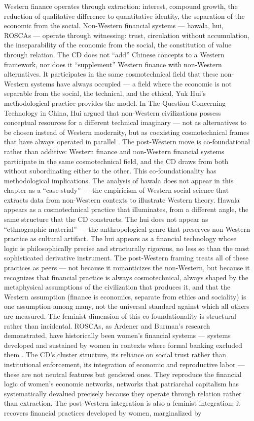 Western finance operates through extraction: interest, compound growth, the reduction of qualitative difference to quantitative identity, the separation of the economic from the social. Non-Western financial systems — hawala, hui, ROSCAs — operate through witnessing: trust, circulation without accumulation, the inseparability of the economic from the social, the constitution of value through relation. The CD does not “add” Chinese concepts to a Western framework, nor does it “supplement” Western finance with non-Western alternatives. It participates in the same cosmotechnical field that these non-Western systems have always occupied — a field where the economic is not separable from the social, the technical, and the ethical. Yuk Hui’s methodological practice provides the model. In The Question Concerning Technology in China, Hui argued that non-Western civilizations possess conceptual resources for a different technical imaginary — not as alternatives to be chosen instead of Western modernity, but as coexisting cosmotechnical frames that have always operated in parallel \cite[pp.~18--45]{hui_2017}. The post-Western move is co-foundational rather than additive: Western finance and non-Western financial systems participate in the same cosmotechnical field, and the CD draws from both without subordinating either to the other. This co-foundationality has methodological implications. The analysis of hawala does not appear in this chapter as a “case study” — the empiricism of Western social science that extracts data from non-Western contexts to illustrate Western theory. Hawala appears as a cosmotechnical practice that illuminates, from a different angle, the same structure that the CD constructs. The hui does not appear as “ethnographic material” — the anthropological genre that preserves non-Western practice as cultural artifact. The hui appears as a financial technology whose logic is philosophically precise and structurally rigorous, no less so than the most sophisticated derivative instrument. The post-Western framing treats all of these practices as peers — not because it romanticizes the non-Western, but because it recognizes that financial practice is always cosmotechnical, always shaped by the metaphysical assumptions of the civilization that produces it, and that the Western assumption (finance is economics, separate from ethics and sociality) is one assumption among many, not the universal standard against which all others are measured. The feminist dimension of this co-foundationality is structural rather than incidental. ROSCAs, as Ardener and Burman’s research demonstrated, have historically been women’s financial systems — systems developed and sustained by women in contexts where formal banking excluded them \cite{ardener_burman_1995}. The CD’s cluster structure, its reliance on social trust rather than institutional enforcement, its integration of economic and reproductive labor — these are not neutral features but gendered ones. They reproduce the financial logic of women’s economic networks, networks that patriarchal capitalism has systematically devalued precisely because they operate through relation rather than extraction. The post-Western integration is also a feminist integration: it recovers financial practices developed by women, marginalized by 